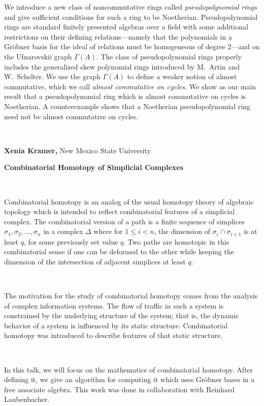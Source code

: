 \documentclass[12pt]{article}
\begin{document}
\noindent We introduce a new class of noncommutative rings called \emph{%
pseudopolynomial rings}\/ and give sufficient conditions for such a ring to
be Noetherian. Pseudopolynomial rings are standard finitely presented
algebras over a field with some additional restrictions on their defining
relations---namely that the polynomials in a Gr\"{o}bner basis for the ideal
of relations must be homogeneous of degree 2---and on the Ufnarovskii graph $%
\Gamma (A)$. The class of pseudopolynomial rings properly includes the
generalized skew polynomial rings introduced by M.~Artin and W.~Schelter. We
use the graph $\Gamma (A)$ to define a weaker notion of almost commutative,
which we call \emph{almost commutative on cycles.} We show as our main
result that a pseudopolynomial ring which is almost commutative on cycles is
Noetherian. A counterexample shows that a Noetherian pseudopolynomial ring
need not be almost commutative on cycles.

\vspace{.1in}\ 

\noindent \textbf{Xenia Kramer,} New Mexico State University

\noindent \textbf{Combinatorial Homotopy of Simplicial Complexes}

\smallskip\ 

\noindent Combinatorial homotopy is an analog of the usual homotopy theory
of algebraic topology which is intended to reflect combinatorial features of
a simplicial complex. The combinatorial version of a path is a finite
sequence of simplices $\sigma _1,\sigma _2,\ldots ,\sigma _n$ in a complex $%
\Delta $ where for $1\leq i<n$, the dimension of $\sigma _i\cap \sigma
_{i+1} $ is at least $q$, for some previously set value $q$. Two paths are
homotopic in this combinatorial sense if one can be deformed to the other
while keeping the dimension of the intersection of adjacent simplices at
least $q$.

\smallskip\ 

\noindent The motivation for the study of combinatorial homotopy comes from
the analysis of complex information systems. The flow of traffic in such a
system is constrained by the underlying structure of the system; that is,
the dynamic behavior of a system is influenced by its static structure.
Combinatorial homotopy was introduced to describe features of that static
structure.

\smallskip\ 

\noindent In this talk, we will focus on the mathematics of combinatorial
homotopy. After defining it, we give an algorithm for computing it which
uses Gr\"{o}bner bases in a free associate algebra. This work was done in
collaboration with Reinhard Laubenbacher.
\end{document}
